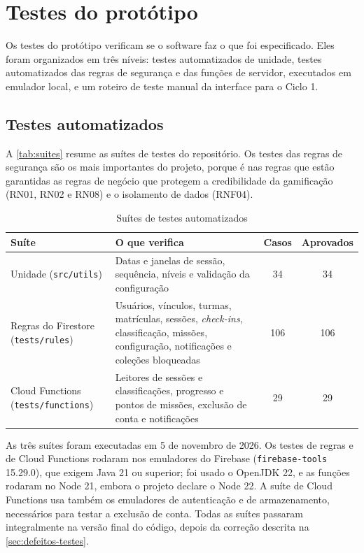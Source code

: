 \section{Testes do protótipo}
\label{sec:testes-prototipo}

Os testes do protótipo verificam se o software faz o que foi
especificado. Eles foram organizados em três níveis: testes automatizados
de unidade, testes automatizados das regras de segurança e das funções
de servidor, executados em emulador local, e um roteiro de teste manual
da interface para o Ciclo 1.

\subsection{Testes automatizados}

A \autoref{tab:suites} resume as suítes de testes do repositório. Os
testes das regras de segurança são os mais importantes do projeto,
porque é nas regras que estão garantidas as regras de negócio que
protegem a credibilidade da gamificação (RN01, RN02 e RN08) e o
isolamento de dados (RNF04).

\begin{table}[!htb]
  \centering
  \caption{Suítes de testes automatizados}
  \label{tab:suites}
  \footnotesize
  \begin{tabular}{p{3.6cm}p{6.6cm}cc}
    \toprule
    \textbf{Suíte} & \textbf{O que verifica} & \textbf{Casos} & \textbf{Aprovados} \\
    \midrule
    Unidade (\texttt{src/utils}) & Datas e janelas de sessão, sequência, níveis e validação da configuração & 34 & 34 \\
    Regras do Firestore (\texttt{tests/rules}) & Usuários, vínculos, turmas, matrículas, sessões, \textit{check-ins}, classificação, missões, configuração, notificações e coleções bloqueadas & 106 & 106 \\
    Cloud Functions (\texttt{tests/functions}) & Leitores de sessões e classificações, progresso e pontos de missões, exclusão de conta e notificações & 29 & 29 \\
    \bottomrule
  \end{tabular}
\end{table}

As três suítes foram executadas em 5 de novembro de 2026. Os testes de
regras e de Cloud Functions rodaram nos emuladores do Firebase
(\texttt{firebase-tools} 15.29.0), que exigem Java 21 ou superior; foi
usado o OpenJDK 22, e as funções rodaram no Node 21, embora o projeto
declare o Node 22. A suíte de Cloud Functions usa também os emuladores de
autenticação e de armazenamento, necessários para testar a exclusão de
conta. Todas as suítes passaram integralmente na versão final
do código, depois da correção descrita na
\autoref{sec:defeitos-testes}.

